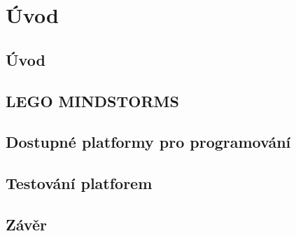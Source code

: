 \chapter{Úvod}
\section{Úvod}
\section{LEGO MINDSTORMS}
\section{Dostupné platformy pro programování}
\section{Testování platforem}
\section{Závěr}

\cite{legoMindstormsSalesStatistic}